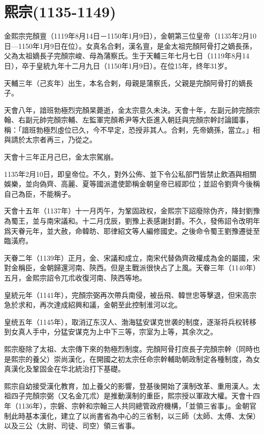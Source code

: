 
\section{熙宗\tiny(1135-1149)}

金熙宗完顏亶（1119年8月14日－1150年1月9日），金朝第三位皇帝（1135年2月10日—1150年1月9日在位）。女真名合剌，漢名亶，是金太祖完顏阿骨打之嫡長孫，父為太祖嫡長子完顏宗峻、母為蒲察氏。生于天輔三年七月七日（1119年8月14日），卒于皇統九年十二月九日（1150年1月9日）。在位15年，终年31岁。

天輔三年（己亥年）出生，本名合剌，母親是蒲察氏，父親是完顏阿骨打的嫡長子。

天會八年，諳班勃極烈完顏杲薨逝，金太宗意久未決。天會十年，左副元帥完顏宗翰、右副元帥完顏宗輔、左監軍完顏希尹等大臣進入朝廷與完顏宗幹討論國事，稱：「諳班勃極烈虛位已久，今不早定，恐授非其人。合剌，先帝嫡孫，當立。」相與請於太宗者再三，乃從之。

天會十三年正月己巳，金太宗駕崩。

1135年2月10日，即皇帝位。不久，對外公佈、並下令公私部門皆禁止飲酒與相關娛樂，並向偽齊、高麗、夏等國派遣使節稱金朝皇帝已經即位；並詔令劉齊今後稱自己為臣，不能稱子。

天會十五年（1137年）十一月丙午，为鞏固政权，金熙宗下詔廢除伪齐，降封劉豫為蜀王，並与南宋議和。十二月戊辰，劉豫上表感謝封爵。不久，發佈詔令改明年爲天眷元年，並大赦，命韓昉、耶律紹文等人編修國史。之後命令蜀王劉豫遷徙至臨潢府。

天眷二年（1139年）正月，金、宋議和成立，南宋代替偽齊政權成為金的屬國，宋對金稱臣，金朝歸還河南、陝西。但是主戰派很快占了上風。天眷三年（1140年）五月，金熙宗詔令兀朮收復河南、陝西等地。

皇統元年（1141年），完顏宗弼再次帶兵南侵，被岳飛、韓世忠等擊退，但宋高宗急於求和，再次達成紹興和議，金朝至此控制淮河以北。

皇统五年（1145年），取消辽东汉人、渤海猛安谋克世袭的制度，逐渐将兵权转移到女真人手中，分猛安谋克为上中下三等，宗室为上等，其余次之。

熙宗廢除了太祖、太宗傳下來的勃極烈制度。完顏阿骨打庶長子完顏宗幹（同時也是熙宗的養父）崇尚漢化，在開國之初太宗任命宗幹輔助朝政制定各種制度，為女真漢化及鞏固金在华北統治打下基礎。

熙宗自幼接受漢化教育，加上養父的影響，登基後開始了漢制改革、重用漢人。太祖四子完顏宗弼（又名金兀朮）是推動漢制的重臣，熙宗授以軍政大權。天會十四年（1136年），宗磐、宗幹和宗翰三人共同總管政府機構，「並領三省事」。金朝官制此時基本漢化，建立了以尚書省為中心的三省制，以三師（太師、太傅、太保）以及三公（太尉、司徒、司空）領三省事。


